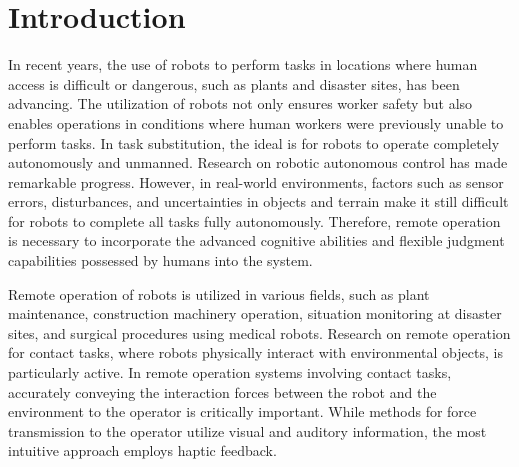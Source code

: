 \documentclass{WileyMSP-template}
\begin{document}

\section{Introduction}
In recent years, the use of robots to perform tasks in locations where human access is difficult or dangerous, such as plants and disaster sites, has been advancing.
The utilization of robots not only ensures worker safety but also enables operations in conditions where human workers were previously unable to perform tasks\cite{murphy}.
In task substitution, the ideal is for robots to operate completely autonomously and unmanned. Research on robotic autonomous control has made remarkable progress\cite{tang, kunze}.
However, in real-world environments, factors such as sensor errors, disturbances, and uncertainties in objects and terrain make it still difficult for robots to complete all tasks fully autonomously.
Therefore, remote operation is necessary to incorporate the advanced cognitive abilities and flexible judgment capabilities possessed by humans into the system\cite{sheridan, darvish}.

Remote operation of robots is utilized in various fields, such as plant maintenance, construction machinery operation, situation monitoring at disaster sites, and surgical procedures using medical robots\cite{hashimoto, lee, okamura}.
Research on remote operation for contact tasks, where robots physically interact with environmental objects, is particularly active\cite{si, zhu, su}.
In remote operation systems involving contact tasks, accurately conveying the interaction forces between the robot and the environment to the operator is critically important.
While methods for force transmission to the operator utilize visual and auditory information, the most intuitive approach employs haptic feedback.
\end{document}
